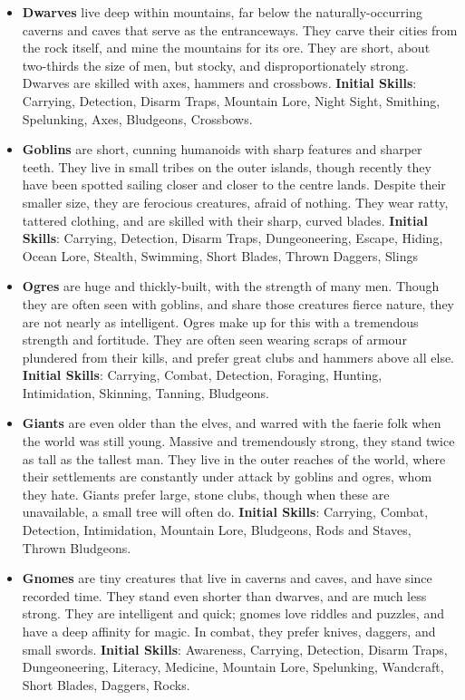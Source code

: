 \begin{itemize}
\item {\bf Dwarves} live deep within mountains, far below the 
naturally-occurring caverns and caves that serve as the entranceways.  They
carve their cities from the rock itself, and mine the mountains for its 
ore.  They are short, about two-thirds the size of men, but stocky, and 
disproportionately strong.  Dwarves are skilled with axes, hammers and 
crossbows. \textbf{Initial Skills}: Carrying, Detection, Disarm Traps,
Mountain Lore, Night Sight, Smithing, Spelunking, Axes, Bludgeons,
Crossbows.

\item {\bf Goblins} are short, cunning humanoids with sharp features and 
sharper teeth.  They live in small tribes on the outer islands, though 
recently they have been spotted sailing closer and closer to the centre 
lands.  Despite their smaller size, they are ferocious creatures, afraid of 
nothing.  They wear ratty, tattered clothing, and are skilled with their 
sharp, curved blades. \textbf{Initial Skills}: Carrying, Detection,
Disarm Traps, Dungeoneering, Escape, Hiding, Ocean Lore, Stealth, Swimming, 
Short Blades, Thrown Daggers, Slings

\item {\bf Ogres} are huge and thickly-built, with the strength of many 
men.  Though they are often seen with goblins, and share those creatures 
fierce nature, they are not nearly as intelligent.  Ogres make up for this 
with a tremendous strength and fortitude.  They are often seen wearing 
scraps of armour plundered from their kills, and prefer great clubs and 
hammers above all else. \textbf{Initial Skills}: Carrying, Combat,
Detection, Foraging, Hunting, Intimidation, Skinning, Tanning, Bludgeons.

\item {\bf Giants} are even older than the elves, and warred with the 
faerie folk when the world was still young.  Massive and tremendously 
strong, they stand twice as tall as the tallest man.  They live in the 
outer reaches of the world, where their settlements are constantly under 
attack by goblins and ogres, whom they hate. Giants prefer large, stone 
clubs, though when these are unavailable, a small tree will often do.
\textbf{Initial Skills}: Carrying, Combat, Detection, Intimidation,
Mountain Lore, Bludgeons, Rods and Staves, Thrown Bludgeons.

\item {\bf Gnomes} are tiny creatures that live in caverns and caves, and 
have since recorded time.  They stand even shorter than dwarves, and are 
much less strong.  They are intelligent and quick; gnomes love riddles and 
puzzles, and have a deep affinity for magic.  In combat, they prefer knives,
daggers, and small swords. \textbf{Initial Skills}: Awareness, Carrying,
Detection, Disarm Traps, Dungeoneering, Literacy, Medicine, Mountain Lore, 
Spelunking, Wandcraft, Short Blades, Daggers, Rocks.
\end{itemize}

